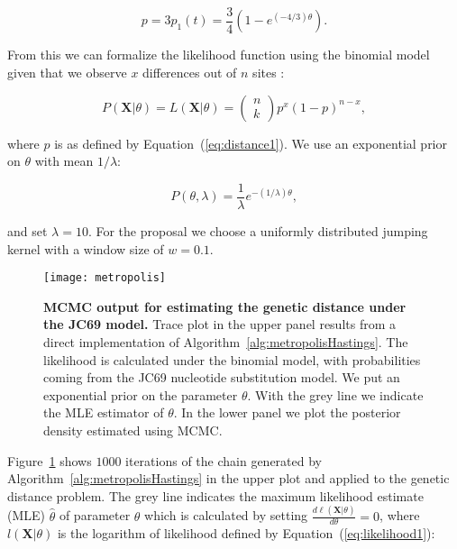 \begin{equation}
p=3p_{1}\left(t\right)=\frac{3}{4}\left(1-e^{\left(-4/3\right)\theta}\right).
\label{eq:distance1}
\end{equation}

\noindent
From this we can formalize the likelihood function using the binomial model given that we observe $x$ differences out of $n$ sites :

\begin{equation}
P\left(\mathbf{X}|\theta\right)=L\left(\mathbf{X}|\theta\right)=\left(\begin{array}{c}
n\\
k
\end{array}\right)p^{x}(1-p)^{n-x},
\label{eq:likelihood1}
\end{equation}

\noindent
where $p$ is as defined by Equation~(\ref{eq:distance1}).
We use an exponential prior on $\theta$ with mean $1/\lambda$:

\begin{equation}
P\left(\theta,\lambda\right)=\frac{1}{\lambda}e^{-(1/\lambda)\theta},
\label{eq:expPrior}
\end{equation}

\noindent
and set $\lambda=10$.
For the proposal we choose a uniformly distributed jumping kernel with a window size of $w=0.1$.

\begin{figure}[H]
\centering
\texttt{[image: metropolis]} 
\caption{
{ \footnotesize 
{\bf MCMC output for estimating the genetic distance under the JC69 model.}
Trace plot in the upper panel results from a direct implementation of Algorithm~\ref{alg:metropolisHastings}.
The likelihood is calculated under the binomial model, with probabilities coming from the JC69 nucleotide substitution model. 
We put an exponential prior on the parameter $\theta$.
With the grey line we indicate the MLE estimator of $\theta$. 
In the lower panel we plot the posterior density estimated using MCMC.
}%
}
\label{fig:metropolis}
\end{figure}

Figure~\ref{fig:metropolis} shows $1000$ iterations of the chain generated by Algorithm~\ref{alg:metropolisHastings} in the upper plot and applied to the genetic distance problem.
The grey line indicates the maximum likelihood estimate (MLE) $\hat{\theta}$ of parameter $\theta$ which is calculated by setting $\frac{d\ell\left(\mathbf{X}|\theta\right)}{d\theta}=0$, where $l\left(\mathbf{X}|\theta\right)$ is the logarithm of likelihood defined by Equation~(\ref{eq:likelihood1}):

